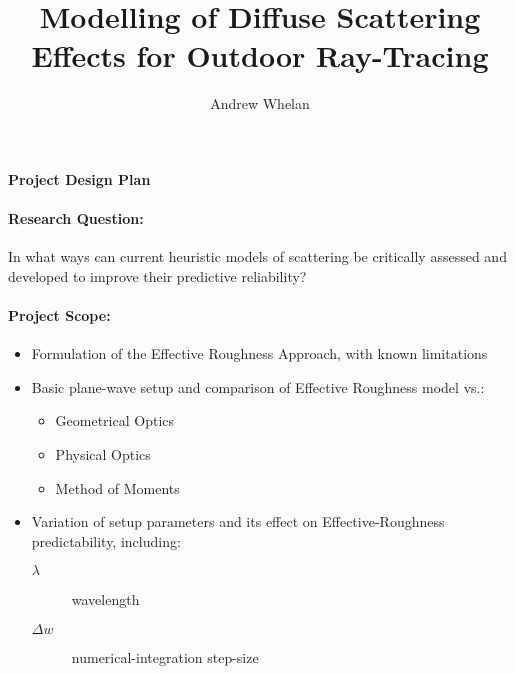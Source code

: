 \documentclass{article} %
\title{Modelling of Diffuse Scattering Effects for Outdoor Ray-Tracing}
\author{Andrew Whelan}
\date{}
\numberwithin{equation}{section}            %
\begin{document}
    \begin{titlepage}
        \centering
        \vspace*{\fill}
        {\Large\bfseries \thetitle \par}
        \vspace{3em}
        {\large\bfseries Project Design Plan \par}
        \vspace{3em}
        {\large\theauthor \par}

        \vspace*{\fill}
        \thispagestyle{empty}   %
        \setcounter{page}{0}    %
    \end{titlepage} 
    \newpage                
    \paragraph*{Research Question:} In what ways can current heuristic 
    models of scattering be critically assessed and developed to improve their
    predictive reliability?
    \paragraph*{Project Scope:} %
        \begin{itemize}
            \item Formulation of the Effective Roughness Approach, with known
                  limitations
            \item Basic plane-wave setup and comparison of Effective Roughness model 
                  vs.:
            \begin{itemize}
                \item Geometrical Optics 
                \item Physical Optics 
                \item Method of Moments
            \end{itemize}
            \item Variation of setup parameters and its effect on Effective-Roughness
                  predictability, including:
            \begin{description}
                \item[$\lambda$] wavelength
                \item[$\Delta w$] numerical-integration step-size
            \end{description}
        \end{itemize}
\end{document}
